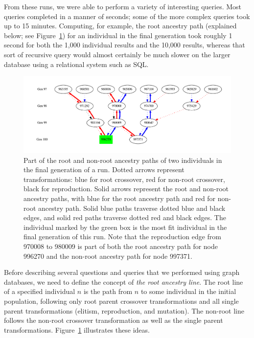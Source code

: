 \documentclass[12pt]{article}
\begin{document}
From these runs, we were able to perform a variety of interesting queries. Most queries completed in a manner of seconds; some of the more complex queries took up to 15 minutes. Computing, for example, the root ancestry path (explained below; see Figure~\ref{fig:XO_path_example}) for an individual in the final generation took roughly 1 second for both the 1,000 individual results and the 10,000 results, whereas that sort of recursive query would almost certainly be much slower on the larger database using a relational system such as SQL.

\begin{figure}[tb]
 \centering
 \includegraphics[width=\textwidth]{XO_path_example}
 \caption{Part of the root and non-root ancestry paths of two individuals in the final generation of a run. Dotted arrows represent transformations: blue for root crossover, red for non-root crossover, black for reproduction. Solid arrows represent the root and non-root ancestry paths, with blue for the root ancestry path and red for non-root ancestry path. Solid blue paths traverse dotted blue and black edges, and solid red paths traverse dotted red and black edges. The individual marked by the green box is the most fit individual in the final generation of this run. Note that the reproduction edge from 970008 to 980009 is part of both the root ancestry path for node 996270 and the non-root ancestry path for node 997371.}
 \label{fig:XO_path_example}
\end{figure}

Before describing several questions and queries that we performed using graph databases, we need to define the concept of \emph{the root ancestry line}. The root line of a specified individual $n$ is the path from $n$ to some individual in the initial population, following only root parent crossover transformations and all single parent transformations (elitism, reproduction, and mutation). The non-root line follows the non-root crossover transformation as well as the single parent transformations. Figure~\ref{fig:XO_path_example} illustrates these ideas.
\end{document}
